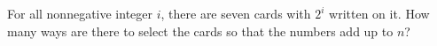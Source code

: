 For all nonnegative integer $i$, there are seven cards with $2^i$ written on it.
How many ways are there to select the cards so that the numbers add up to $n$?